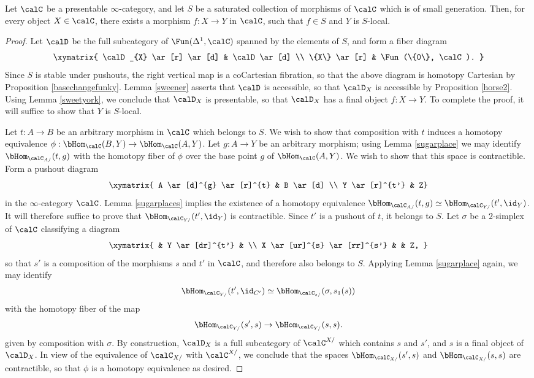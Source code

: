\begin{lemma}\label{superlocal}
Let $\calC$ be a presentable $\infty$-category, and let $S$ be a saturated collection of morphisms of $\calC$ which is of small generation. Then, for every object $X \in \calC$, there exists a morphism
$f: X \rightarrow Y$ in $\calC$, such that $f \in S$ and $Y$ is $S$-local.
\end{lemma}

\begin{proof}
Let $\calD$ be the full subcategory of $\Fun(\Delta^1,\calC)$ spanned by the elements of $S$, and form a fiber diagram
$$ \xymatrix{ \calD_{X} \ar[r] \ar[d] & \calD \ar[d] \\
\{X\} \ar[r] & \Fun(\{0\}, \calC). }$$
Since $S$ is stable under pushouts, the right vertical map is a coCartesian fibration, so that the above diagram is homotopy Cartesian by Proposition \ref{basechangefunky}. Lemma 
\ref{sweener} asserts that $\calD$ is accessible, so that $\calD_{X}$ is accessible by Proposition \ref{horse2}. Using Lemma \ref{sweetyork}, we conclude that $\calD_{X}$ is presentable, so that
$\calD_{X}$ has a final object $f: X \rightarrow Y$. To complete the proof, it will suffice to show that $Y$ is $S$-local.

Let $t: A \rightarrow B$ be an arbitrary morphism in $\calC$ which belongs to $S$. We wish to show that composition with $t$ induces a homotopy equivalence $\phi: \bHom_{\calC}(B,Y) \rightarrow \bHom_{\calC}(A,Y)$. Let $g: A \rightarrow Y$ be an arbitrary morphism; using Lemma \ref{sugarplace} we may identify $\bHom_{\calC_{A/}}(t,g)$ with the homotopy fiber of
$\phi$ over the base point $g$ of $\bHom_{\calC}(A,Y)$. We wish to show that this space
is contractible. Form a pushout diagram
$$ \xymatrix{ A \ar[d]^{g} \ar[r]^{t} & B \ar[d] \\
Y \ar[r]^{t'} & Z}$$
in the $\infty$-category $\calC$. 
Lemma \ref{sugarplaces} implies the existence of a homotopy equivalence
$\bHom_{\calC_{A/}}(t,g) \simeq \bHom_{\calC_{Y/}}(t', \id_{Y})$. It will therefore suffice to prove that $\bHom_{\calC_{Y/}}(t', \id_{Y})$ is contractible. Since $t'$ is a pushout of $t$, it belongs to $S$. Let
$\sigma$ be a $2$-simplex of $\calC$ classifying a diagram
$$ \xymatrix{ & Y \ar[dr]^{t'} & \\
X \ar[ur]^{s} \ar[rr]^{s'} & & Z, }$$
so that $s'$ is a composition of the morphisms $s$ and $t'$ in $\calC$, and therefore also belongs to $S$.
Applying Lemma \ref{sugarplace} again, we may identify
$$\bHom_{\calC_{Y/}}(t', \id_{C'}) \simeq \bHom_{\calC_{s/}}(\sigma, s_1(s))$$ with the homotopy fiber of the map
$$ \bHom_{ \calC_{Y/}}(s',s) \rightarrow \bHom_{ \calC_{Y/}}(s,s).$$
given by composition with $\sigma$.
By construction, $\calD_{X}$ is a full subcategory of $\calC^{X/}$ which contains
$s$ and $s'$, and $s$ is a final object of $\calD_{X}$.
In view of the equivalence of $\calC_{X/}$ with $\calC^{X/}$, we conclude that the spaces
$\bHom_{\calC_{X/}}(s',s)$ and $\bHom_{\calC_{X/}}(s,s)$ are contractible, so that
$\phi$ is a homotopy equivalence as desired.
\end{proof}

